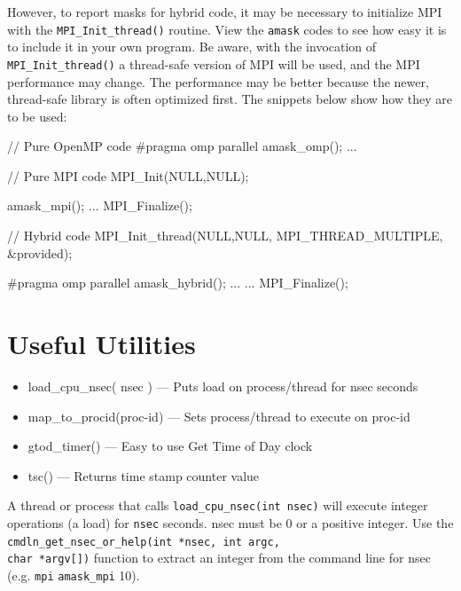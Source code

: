\documentclass[10pt,a4paper]{report}
\begin{document}
However, to report masks for hybrid code, it may be necessary
to initialize MPI with the \verb+MPI_Init_thread()+ routine. View the \verb+amask+ codes to see how easy
it is to include it in your own program. Be aware, with the invocation of
\verb+MPI_Init_thread()+ a thread-safe version of MPI will be used, and the MPI performance
may change.  The performance may be better because the newer, thread-safe library is often
optimized first.  The snippets below show how they are to be used:



\begin{code}[frame=single,breaklines=true,numbers=left,language=C,caption=Invoking mask report inside code\label{code:apimask}]
 // Pure OpenMP code
    #pragma omp parallel
    {
       amask_omp();
     ...
    }

 // Pure MPI code
    MPI_Init(NULL,NULL);

       amask_mpi();
    ...
    MPI_Finalize();

 // Hybrid code
    MPI_Init_thread(NULL,NULL, MPI_THREAD_MULTIPLE, &provided);

   #pragma omp parallel
   {
      amask_hybrid();
      ...
   }
   ...
   MPI_Finalize();
\end{code}


\section{Useful Utilities}
\begin{itemize}
\item load\_cpu\_nsec( nsec )   --- Puts load on process/thread for nsec seconds
\item map\_to\_procid(proc-id)   --- Sets process/thread to execute on proc-id
\item gtod\_timer()           --- Easy to use Get Time of Day clock
\item tsc() --- Returns time stamp counter value
\end{itemize}

A thread or process that calls \verb+load_cpu_nsec(int nsec)+ will execute integer
operations (a load) for \verb+nsec+ seconds.  nsec must be 0 or a positive integer.  Use the
\verb+cmdln_get_nsec_or_help(int *nsec, int argc,+ \\
\verb+char *argv[])+ function to extract an
integer from the command line for nsec (e.g. \verb+mpi+ \verb+amask_mpi+ 10).
\end{document}
